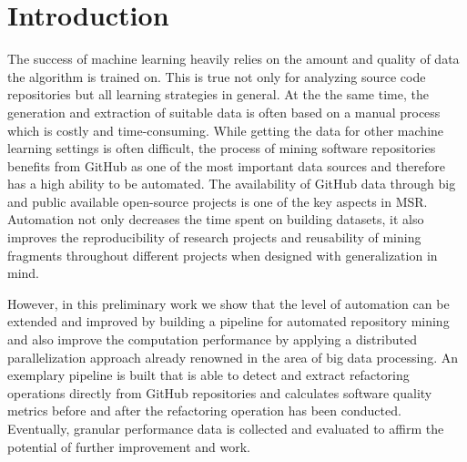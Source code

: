 
\section{Introduction}
\label{sec:intro}
The success of machine learning heavily relies on the amount and quality of data the algorithm is trained on. This is true not only for analyzing source code repositories but all learning strategies in general. At the the same time, the generation and extraction of suitable data is often based on a manual process which is costly and time-consuming. While getting the data for other machine learning settings is often difficult, the process of mining software repositories benefits from GitHub as one of the most important data sources and therefore has a high ability to be automated. The availability of GitHub data through big and public available open-source projects is one of the key aspects in MSR. Automation not only decreases the time spent on building datasets, it also improves the reproducibility of research projects and reusability of mining fragments throughout different projects when designed with generalization in mind.

However, in this preliminary work we show that the level of automation can be extended and improved by building a pipeline for automated repository mining and also improve the computation performance by applying a distributed parallelization approach already renowned in the area of big data processing. An exemplary pipeline is built that is able to detect and extract refactoring operations directly from GitHub repositories and calculates software quality metrics before and after the refactoring operation has been conducted. Eventually,  granular performance data is collected and evaluated to affirm the potential of further improvement and work.
